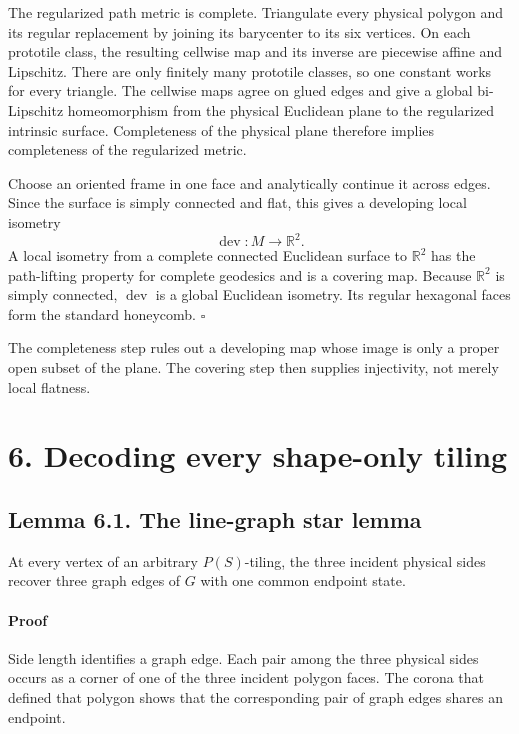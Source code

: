 \documentclass[11pt]{article}
\begin{document}
The regularized path metric is complete. Triangulate every physical polygon
and its regular replacement by joining its barycenter to its six vertices.
On each prototile class, the resulting cellwise map and its inverse are
piecewise affine and Lipschitz. There are only finitely many prototile
classes, so one constant works for every triangle. The cellwise maps agree
on glued edges and give a global bi-Lipschitz homeomorphism from the physical
Euclidean plane to the regularized intrinsic surface. Completeness of the
physical plane therefore implies completeness of the regularized metric.

Choose an oriented frame in one face and analytically continue it across
edges. Since the surface is simply connected and flat, this gives a
developing local isometry
\[
  \operatorname{dev}:M\longrightarrow\mathbb R^2.
\]
A local isometry from a complete connected Euclidean surface to
\(\mathbb R^2\) has the path-lifting property for complete geodesics and is
a covering map. Because \(\mathbb R^2\) is simply connected,
\(\operatorname{dev}\) is a global Euclidean isometry. Its regular hexagonal
faces form the standard honeycomb. \(\square\)

The completeness step rules out a developing map whose image is only a
proper open subset of the plane. The covering step then supplies injectivity,
not merely local flatness.

\section*{6. Decoding every shape-only tiling}

\subsection*{Lemma 6.1. The line-graph star lemma}

At every vertex of an arbitrary \(P(S)\)-tiling, the three incident physical
sides recover three graph edges of \(G\) with one common endpoint state.

\paragraph{Proof}

Side length identifies a graph edge. Each pair among the three physical
sides occurs as a corner of one of the three incident polygon faces. The
corona that defined that polygon shows that the corresponding pair of graph
edges shares an endpoint.
\end{document}
